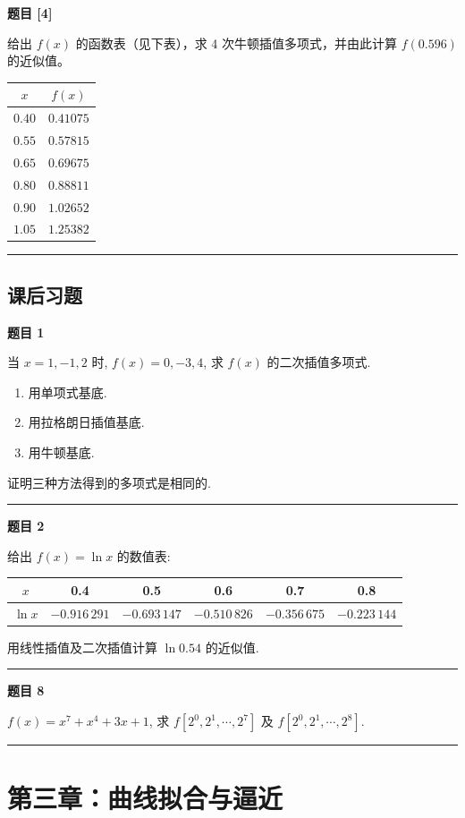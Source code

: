 \documentclass[a4paper,12pt]{ctexart}
\newcommand{\problem}[1]{
    \par\noindent\textbf{题目 #1} \quad
}
\newcommand{\workspace}[1][5cm]{
    \par
    \vspace{#1}
    \noindent\rule{\textwidth}{0.1pt} %
    \vspace{0.5em}
    \par
}
\begin{document}
\problem{[4]}
给出 $f(x)$ 的函数表（见下表），求 4 次牛顿插值多项式，并由此计算 $f(0.596)$ 的近似值。
\begin{table}[H]
\centering
\begin{tabular}{c c}
\toprule
$x$ & $f(x)$ \\
\midrule
$0.40$ & $0.41075$ \\
$0.55$ & $0.57815$ \\
$0.65$ & $0.69675$ \\
$0.80$ & $0.88811$ \\
$0.90$ & $1.02652$ \\
$1.05$ & $1.25382$ \\
\bottomrule
\end{tabular}
\end{table}
\workspace[8cm]

\subsection*{课后习题}

\problem{1}
当 $x = 1, -1, 2$ 时, $f(x) = 0, -3, 4$, 求 $f(x)$ 的二次插值多项式.
\begin{enumerate}
    \item 用单项式基底.
    \item 用拉格朗日插值基底.
    \item 用牛顿基底.
\end{enumerate}
证明三种方法得到的多项式是相同的.
\workspace[10cm]

\problem{2}
给出 $f(x) = \ln x$ 的数值表:
\begin{center}
\begin{tabular}{c|c|c|c|c|c}
\toprule
$x$ & 0.4 & 0.5 & 0.6 & 0.7 & 0.8 \\
\midrule
$\ln x$ & $-0.916\,291$ & $-0.693\,147$ & $-0.510\,826$ & $-0.356\,675$ & $-0.223\,144$ \\
\bottomrule
\end{tabular}
\end{center}
用线性插值及二次插值计算 $\ln 0.54$ 的近似值.
\workspace[8cm]

\problem{8}
$f(x) = x^7 + x^4 + 3x + 1$, 求 $f[2^0, 2^1, \cdots, 2^7]$ 及 $f[2^0, 2^1, \cdots, 2^8]$.
\workspace[4cm]

\newpage

\section{第三章：曲线拟合与逼近}
\end{document}
